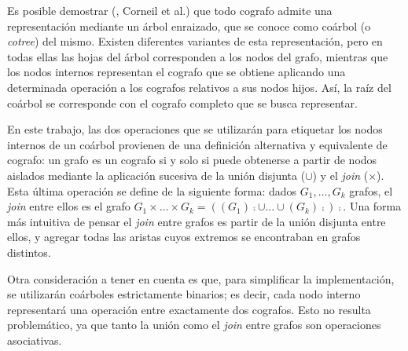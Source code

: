 Es posible demostrar (\cite{corneil}, Corneil et al.) que todo cografo
admite una representación mediante un árbol enraizado, que se conoce como
coárbol (o \emph{cotree}) del mismo. Existen diferentes variantes de esta
representación, pero en todas ellas las hojas del árbol corresponden a los
nodos del grafo, mientras que los nodos internos representan el cografo que se
obtiene aplicando una determinada operación a los cografos relativos a sus
nodos hijos. Así, la raíz del coárbol se corresponde con el cografo completo
que se busca representar.


En este trabajo, las dos operaciones que se utilizarán para etiquetar los
nodos internos de un coárbol provienen de una definición alternativa y
equivalente de cografo: un grafo es un cografo si y solo si puede obtenerse a
partir de nodos aislados mediante la aplicación sucesiva de la unión disjunta
($\cup$) y el \emph{join} ($\times$). Esta última operación se define de la
siguiente forma: dados $G_1, \dots, G_k$ grafos, el \emph{join} entre ellos es
el grafo $G_1 \times \dots \times G_k = \left((G_1)\comp \cup
\dots \cup (G_k)\comp\right)\comp$. Una forma más intuitiva de pensar el
\emph{join} entre grafos es partir de la unión disjunta entre ellos, y agregar
todas las aristas cuyos extremos se encontraban en grafos distintos.

Otra consideración a tener en cuenta es que, para simplificar la
implementación, se utilizarán coárboles estrictamente binarios; es decir,
cada nodo interno representará una operación entre exactamente dos cografos.
Esto no resulta problemático, ya que tanto la unión como el \emph{join} entre
grafos son operaciones asociativas.

